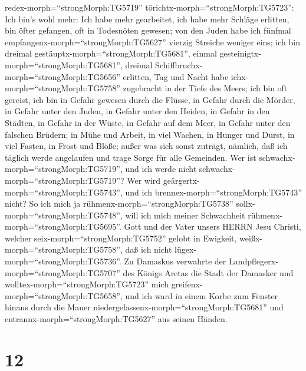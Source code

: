 redex-morph=``strongMorph:TG5719''
törichtx-morph=``strongMorph:TG5723'': Ich bin's wohl mehr: Ich habe
mehr gearbeitet, ich habe mehr Schläge erlitten, bin öfter gefangen, oft
in Todesnöten gewesen;  von den Juden habe ich fünfmal
empfangenx-morph=``strongMorph:TG5627'' vierzig Streiche weniger eins;
 ich bin dreimal gestäuptx-morph=``strongMorph:TG5681'',
einmal gesteinigtx-morph=``strongMorph:TG5681'', dreimal
Schiffbruchx-morph=``strongMorph:TG5656'' erlitten, Tag und Nacht habe
ichx-morph=``strongMorph:TG5758'' zugebracht in der Tiefe des Meers;
 ich bin oft gereist, ich bin in Gefahr gewesen durch die
Flüsse, in Gefahr durch die Mörder, in Gefahr unter den Juden, in Gefahr
unter den Heiden, in Gefahr in den Städten, in Gefahr in der Wüste, in
Gefahr auf dem Meer, in Gefahr unter den falschen Brüdern; 
in Mühe und Arbeit, in viel Wachen, in Hunger und Durst, in viel Fasten,
in Frost und Blöße;  außer was sich sonst zuträgt, nämlich,
daß ich täglich werde angelaufen und trage Sorge für alle Gemeinden.
 Wer ist schwachx-morph=``strongMorph:TG5719'', und ich
werde nicht schwachx-morph=``strongMorph:TG5719''? Wer wird
geärgertx-morph=``strongMorph:TG5743'', und ich
brennex-morph=``strongMorph:TG5743'' nicht?  So ich mich ja
rühmenx-morph=``strongMorph:TG5738'' sollx-morph=``strongMorph:TG5748'',
will ich mich meiner Schwachheit rühmenx-morph=``strongMorph:TG5695''.
 Gott und der Vater unsers HERRN Jesu Christi, welcher
seix-morph=``strongMorph:TG5752'' gelobt in Ewigkeit,
weißx-morph=``strongMorph:TG5758'', daß ich nicht
lügex-morph=``strongMorph:TG5736''.  Zu Damaskus verwahrte
der Landpflegerx-morph=``strongMorph:TG5707'' des Königs Aretas die
Stadt der Damasker und wolltex-morph=``strongMorph:TG5723'' mich
greifenx-morph=``strongMorph:TG5658'',  und ich ward in
einem Korbe zum Fenster hinaus durch die Mauer
niedergelassenx-morph=``strongMorph:TG5681'' und
entrannx-morph=``strongMorph:TG5627'' aus seinen Händen.

\hypertarget{section-11}{%
\section{12}\label{section-11}}

